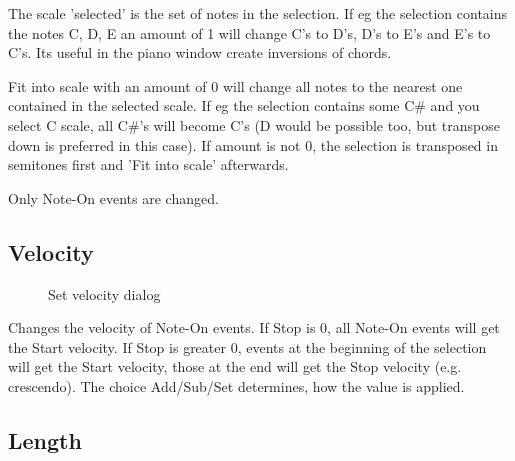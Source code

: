 \documentclass[letterpaper]{report}
\begin{document}
The scale 'selected' is the set of notes in the selection. If eg the selection
contains the notes C, D, E an amount of 1 will change C's to D's, D's to E's and
E's to C's. Its useful in the piano window create inversions of chords.

Fit into scale with an amount of 0 will change all notes to the nearest one
contained in the selected scale. If eg the selection contains some C\# and you
select C scale, all C\#'s will become C's (D would be possible too, but transpose
down is preferred in this case). If amount is not 0, the selection is transposed
in semitones first and 'Fit into scale' afterwards.

Only Note-On events are changed.


\subsection{Velocity}\label{veloc}

\begin{figure}
\caption{Set velocity dialog}
\end{figure}

Changes the velocity of Note-On events. If Stop is 0, all Note-On events will get
the Start velocity. If Stop is greater 0, events at the beginning of the selection
will get the Start velocity, those at the end will get the Stop velocity
(e.g. crescendo). The choice Add/Sub/Set determines, how the value is applied.


\subsection{Length}\label{length}
\end{document}
